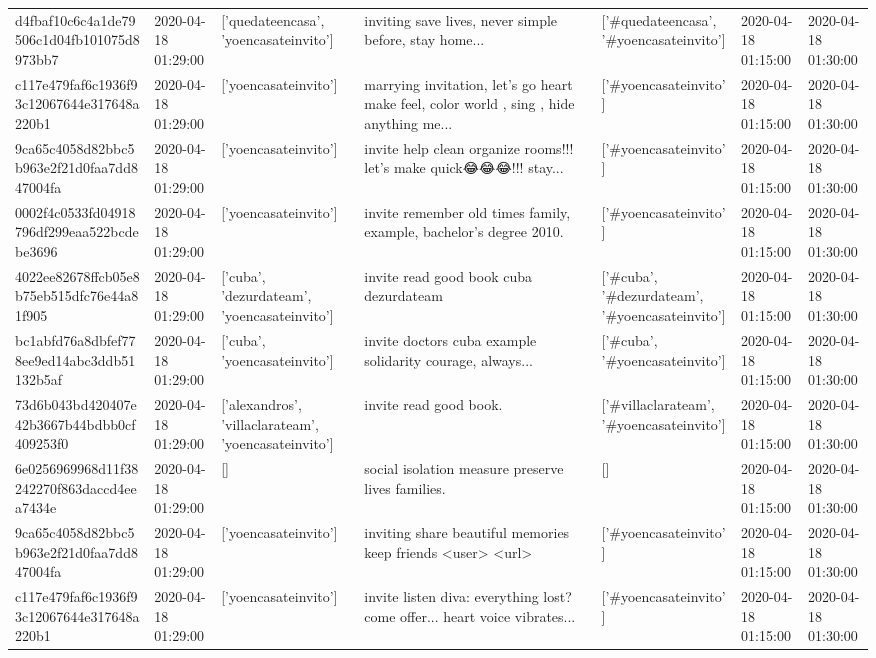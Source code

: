 \begin{tabular}{lllllll}
d4fbaf10c6c4a1de79506c1d04fb101075d8973bb7 & 2020-04-18 01:29:00 & ['quedateencasa', 'yoencasateinvito'] & inviting save lives, never simple before, stay home... & ['#quedateencasa', '#yoencasateinvito'] & 2020-04-18 01:15:00 & 2020-04-18 01:30:00 \\
c117e479faf6c1936f93c12067644e317648a220b1 & 2020-04-18 01:29:00 & ['yoencasateinvito'] & marrying invitation, let's go heart 💖 make feel, color world , sing , hide anything me... & ['#yoencasateinvito'] & 2020-04-18 01:15:00 & 2020-04-18 01:30:00 \\
9ca65c4058d82bbc5b963e2f21d0faa7dd847004fa & 2020-04-18 01:29:00 & ['yoencasateinvito'] & invite help clean organize rooms!!! let's make quick😂😂😂!!! stay... & ['#yoencasateinvito'] & 2020-04-18 01:15:00 & 2020-04-18 01:30:00 \\
0002f4c0533fd04918796df299eaa522bcdebe3696 & 2020-04-18 01:29:00 & ['yoencasateinvito'] & invite remember old times family, example, bachelor's degree 2010. & ['#yoencasateinvito'] & 2020-04-18 01:15:00 & 2020-04-18 01:30:00 \\
4022ee82678ffcb05e8b75eb515dfc76e44a81f905 & 2020-04-18 01:29:00 & ['cuba', 'dezurdateam', 'yoencasateinvito'] & invite read good book cuba dezurdateam & ['#cuba', '#dezurdateam', '#yoencasateinvito'] & 2020-04-18 01:15:00 & 2020-04-18 01:30:00 \\
bc1abfd76a8dbfef778ee9ed14abc3ddb51132b5af & 2020-04-18 01:29:00 & ['cuba', 'yoencasateinvito'] & invite doctors cuba example solidarity courage, always... & ['#cuba', '#yoencasateinvito'] & 2020-04-18 01:15:00 & 2020-04-18 01:30:00 \\
73d6b043bd420407e42b3667b44bdbb0cf409253f0 & 2020-04-18 01:29:00 & ['alexandros', 'villaclarateam', 'yoencasateinvito'] & invite read good book. & ['#villaclarateam', '#yoencasateinvito'] & 2020-04-18 01:15:00 & 2020-04-18 01:30:00 \\
6e0256969968d11f38242270f863daccd4eea7434e & 2020-04-18 01:29:00 & [] & social isolation measure preserve lives families. & [] & 2020-04-18 01:15:00 & 2020-04-18 01:30:00 \\
9ca65c4058d82bbc5b963e2f21d0faa7dd847004fa & 2020-04-18 01:29:00 & ['yoencasateinvito'] & inviting share beautiful memories keep friends <user> <url> & ['#yoencasateinvito'] & 2020-04-18 01:15:00 & 2020-04-18 01:30:00 \\
c117e479faf6c1936f93c12067644e317648a220b1 & 2020-04-18 01:29:00 & ['yoencasateinvito'] & invite listen diva: everything lost? come offer... heart voice vibrates... & ['#yoencasateinvito'] & 2020-04-18 01:15:00 & 2020-04-18 01:30:00 \\

\end{tabular}
